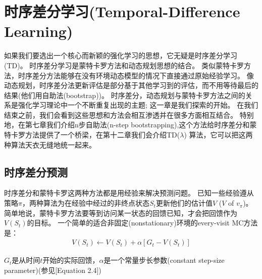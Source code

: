 \documentclass{book}
\begin{document}


\chapter{时序差分学习(Temporal-Difference Learning)}
如果我们要选出一个核心而新颖的强化学习的思想，它无疑是时序差分学习(TD)。
时序差分学习是蒙特卡罗方法和动态规划思想的结合。
类似蒙特卡罗方法，时序差分方法能够在没有环境动态模型的情况下直接通过原始经验学习。
像动态规划，时序差分法更新评估是部分基于其他学习到的评估，而不用等待最后的结果(他们用自助法(bootstrap))。
时序差分，动态规划与蒙特卡罗方法之间的关系是强化学习理论中一个不断重复出现的主题; 这一章是我们探索的开始。
在我们结束之前，我们会看到这些思想和方法会相互渗透并在很多方面相互结合。
特别地，在第七章我们介绍n步自助法(n-step bootstrapping),这个方法给时序差分和蒙特卡罗方法提供了一个桥梁，在第十二章我们会介绍TD($\lambda$) 算法，它可以把这两种算法天衣无缝地统一起来。

\section{时序差分预测}
时序差分和蒙特卡罗这两种方法都是用经验来解决预测问题。
已知一些经验遵从策略$\pi$，两种算法为在经验中经过的非终点状态$S_t$更新他们的估计值$V$ ($V$ of $v_\pi$)。
简单地说，蒙特卡罗方法要等到访问某一状态的回馈已知，才会把回馈作为$V(S_t)$的目标。
一个简单的适合非固定(nonstationary)环境的every-visit MC方法是：
\begin{align}
	V(S_t) \leftarrow V(S_t) + \alpha[G_t - V(S_t)]
\end{align}

$G_t$是从时间$t$开始的实际回馈，$\alpha$是一个常量步长参数(constant step-size parameter)(参见[Equation 2.4])
\end{document}
